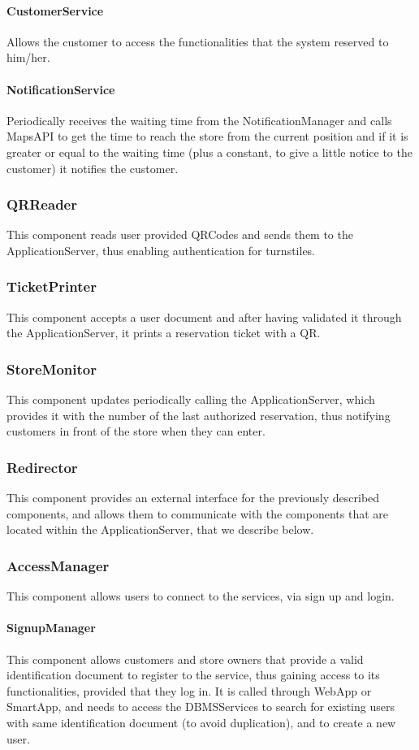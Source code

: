 \paragraph{CustomerService}Allows the customer to access the functionalities that the system reserved to him/her.
\paragraph{NotificationService}Periodically receives the waiting time from the NotificationManager and calls MapsAPI to get the time to reach the store from the current position and if it is greater or equal to the waiting time (plus a constant, to give a little notice to the customer) it notifies the customer.
\subsubsection{QRReader}
This component reads user provided QRCodes and sends them to the ApplicationServer, thus enabling authentication for turnstiles.
\subsubsection{TicketPrinter}
This component accepts a user document and after having validated it through the ApplicationServer, it prints a reservation ticket with a QR.
\subsubsection{StoreMonitor}
This component updates periodically calling the ApplicationServer, which provides it with the number of the last authorized reservation, thus notifying customers in front of the store when they can enter.
\subsubsection{Redirector}
This component provides an external interface for the previously described components, and allows them to communicate with the components that are located within the ApplicationServer, that we describe below.
\subsubsection{AccessManager}
This component allows users to connect to the services, via sign up and login.
\paragraph{SignupManager}
This component allows customers and store owners that provide a valid identification document to register to the service, thus gaining access to its functionalities, provided that they log in. It is called through WebApp or SmartApp, and needs to access the DBMSServices to search for existing users with same identification document (to avoid duplication), and to create a new user.
